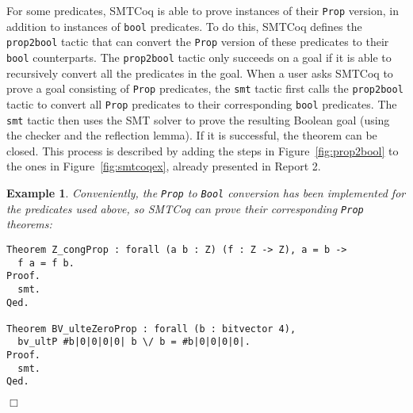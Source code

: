 \documentclass[11pt]{article}
\newtheorem{example}{Example}[section]
\begin{document}
	For some predicates, SMTCoq is 
	able to prove instances of their 
	\texttt{Prop} version, in addition 
	to instances of \texttt{bool}
	predicates. To do this, SMTCoq
	defines the \texttt{prop2bool} 
	tactic that can convert the
	\texttt{Prop} version of these 
	predicates to their \texttt{bool}
	counterparts. The \texttt{prop2bool}
	tactic only succeeds on a goal if 
	it is able to recursively convert all 
	the predicates in the goal. 
	When a user asks 
	SMTCoq to prove a goal consisting 
	of \texttt{Prop} predicates, the 
	\texttt{smt} tactic first calls the 
	\texttt{prop2bool} tactic to 
	convert all \texttt{Prop} predicates
	to their corresponding \texttt{bool}
	predicates. The \texttt{smt} tactic
	then uses the SMT solver to 
	prove the resulting Boolean goal 
	(using the 
	checker and the reflection lemma). 
	If it is successful, the 
	theorem can be closed. This process
	is described by adding the steps in 
	Figure~\ref{fig:prop2bool} to the 
	ones in Figure~\ref{fig:smtcoqex},
	already presented in Report 2.
	
	\begin{example}
		\em Conveniently, the \texttt{Prop} to 
		\texttt{Bool} conversion has 
		been implemented for the 
		predicates used above,
		so SMTCoq can prove their 
		corresponding \texttt{Prop}
		theorems:
		\begin{verbatim}
Theorem Z_congProp : forall (a b : Z) (f : Z -> Z), a = b -> 
  f a = f b.
Proof.
  smt.
Qed.
	
Theorem BV_ulteZeroProp : forall (b : bitvector 4), 
  bv_ultP #b|0|0|0|0| b \/ b = #b|0|0|0|0|.
Proof.
  smt.
Qed.
		\end{verbatim}
		\hfill$\Box$
	\end{example}
	
\end{document}

